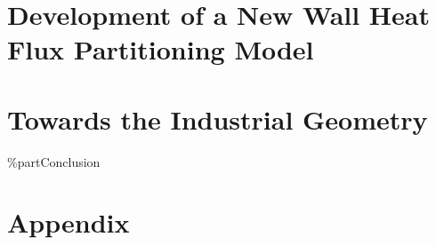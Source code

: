 





\cleardoublepage %


\part{Development of a New Wall Heat Flux Partitioning Model}








  






\cleardoublepage %


\part{Towards the Industrial Geometry}




\%part{Conclusion} %





\cleardoublepage %




\appendix

\part{Appendix} %




